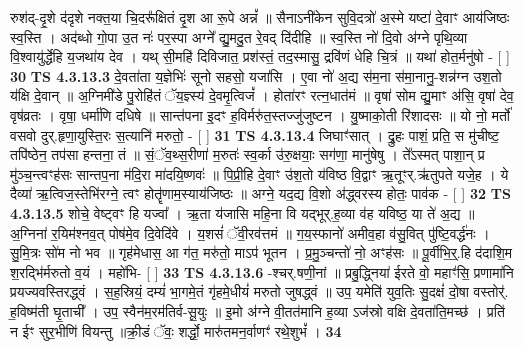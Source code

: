 \documentclass[17pt]{extarticle}
\begin{document}
                  रुश॑द्-दृ॒शे द॑दृशे नक्त॒या चि॒दरू᳚क्षितं दृ॒श आ रू॒पे अन्नं᳚ ॥ सैनाऽनी॑केन सुवि॒दत्रो॑ अ॒स्मे यष्टा॑ दे॒वाꣳ आय॑जिष्ठः स्व॒स्ति । अद॑ब्धो गो॒पा उ॒त नः॑ पर॒स्पा अग्ने᳚ द्यु॒मदु॒त रे॒वद् दि॑दीहि ॥ स्व॒स्ति नो॑ दि॒वो अ॑ग्ने पृथि॒व्या वि॒श्वायु॑र्द्धेहि य॒जथा॑य देव । यथ् सी॒महि॑ दिविजात॒ प्रश॑स्तं॒ तद॒स्मासु॒ द्रवि॑णं धेहि चि॒त्रं ॥ यथा॑ होत॒र्मनु॑षो - [  ] \textbf{  30} \newline
                  \newline
                                \textbf{ TS 4.3.13.3} \newline
                  दे॒वता॑ता य॒ज्ञेभिः॑ सूनो सहसो॒ यजा॑सि । ए॒वा नो॑ अ॒द्य स॑म॒ना स॑मा॒नानु॒-शन्न॑ग्न उश॒तो य॑क्षि दे॒वान् ॥ अ॒ग्निमी॑डे पु॒रोहि॑तं ॅय॒ज्ञ्स्य॑ दे॒वमृ॒त्विजं᳚ । होता॑रꣳ रत्न॒धात॑मं ॥ वृषा॑ सोम द्यु॒माꣳ अ॑सि॒ वृषा॑ देव॒ वृष॑व्रतः । वृषा॒ धर्मा॑णि दधिषे ॥ सान्त॑पना इ॒दꣳ ह॒विर्मरु॑त॒स्तज्जु॑जुष्टन । यु॒ष्माको॒ती रि॑शादसः ॥ यो नो॒ मर्तो॑ वसवो दुर्.हृणा॒युस्ति॒रः स॒त्यानि॑ मरुतो॒ - [  ] \textbf{  31 } \newline
                  \newline
                                \textbf{ TS 4.3.13.4} \newline
                  जिघाꣳ॑सात् । द्रु॒हः पाशं॒ प्रति॒ स मु॑चीष्ट॒ तपि॑ष्ठेन॒ तप॑सा हन्तना॒ तं ॥ सं॒ॅव॒थ्स॒रीणा॑ म॒रुतः॑ स्व॒र्का उ॑रु॒क्षयाः॒ सग॑णा॒ मानु॑षेषु । ते᳚ऽस्मत् पाशा॒न् प्र मु॑ञ्च॒न्त्वꣳह॑सः सान्तप॒ना म॑दि॒रा मा॑दयि॒ष्णवः॑ ॥ पि॒प्री॒हि दे॒वाꣳ उ॑श॒तो य॑विष्ठ वि॒द्वाꣳ ऋ॒तूꣳर्.ऋ॑तुपते यजे॒ह । ये दैव्या॑ ऋ॒त्विज॒स्तेभि॑रग्ने॒ त्वꣳ होतॄ॑णाम॒स्याय॑जिष्ठः ॥ अग्ने॒ यद॒द्य वि॒शो अ॑द्ध्वरस्य होतः॒ पाव॑क - [  ] \textbf{  32} \newline
                  \newline
                                \textbf{ TS 4.3.13.5} \newline
                  शोचे॒ वेष्ट्वꣳ हि यज्वा᳚ । ऋ॒ता य॑जासि महि॒ना वि यद्भूर्.ह॒व्या व॑ह यविष्ठ॒ या ते॑ अ॒द्य ॥ अ॒ग्निना॑ र॒यिम॑श्नव॒त् पोष॑मे॒व दि॒वेदि॑वे । य॒शसं॑ ॅवी॒रव॑त्तमं ॥ ग॒य॒स्फानो॑ अमीव॒हा व॑सु॒वित् पु॑ष्टि॒वर्द्ध॑नः । सु॒मि॒त्रः सो॑म नो भव ॥ गृह॑मेधास॒ आ ग॑त॒ मरु॑तो॒ माऽप॑ भूतन । प्र॒मु॒ञ्चन्तो॑ नो॒ अꣳह॑सः ॥ पू॒र्वीभि॒र्॒.हि द॑दाशि॒म श॒रद्भि॑र्मरुतो व॒यं । महो॑भि- [  ] \textbf{  33 } \newline
                  \newline
                                \textbf{ TS 4.3.13.6} \newline
                  -श्चर्.षणी॒नां ॥ प्रबु॒द्ध्निया॑ ईरते वो॒ महाꣳ॑सि॒ प्रणामा॑नि प्रयज्यवस्तिरद्ध्वं । स॒ह॒स्रियं॒ दम्यं॑ भा॒गमे॒तं गृ॑हमे॒धीयं॑ मरुतो जुषद्ध्वं ॥ उप॒ यमेति॑ युव॒तिः सु॒दक्षं॑ दो॒षा वस्तोर्॑. ह॒विष्म॑ती घृ॒ताची᳚ । उप॒ स्वैन॑म॒रम॑तिर्व-सू॒युः ॥ इ॒मो अ॑ग्ने वी॒तत॑मानि ह॒व्या ऽज॑स्रो वक्षि दे॒वता॑ति॒मच्छ॑ । प्रति॑ न ईꣳ सुर॒भीणि॑ वियन्तु ॥क्री॒डं ॅवः॒ शर्द्धो॒ मारु॑तमन॒र्वाणꣳ॑ रथे॒शुभं᳚ । \textbf{  34} \newline
\end{document}
